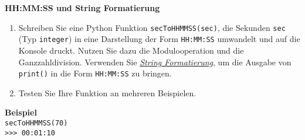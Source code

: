 \textbf{HH:MM:SS und String Formatierung}
\begin{enumerate}
	\item  Schreiben Sie eine Python Funktion \verb|secToHHMMSS(sec)|, die Sekunden \texttt{sec} (Typ \verb|integer|) in eine Darstellung der Form \verb|HH:MM:SS| umwandelt und auf die Konsole druckt. Nutzen Sie dazu die Modulooperation und die Ganzzahldivision. Verwenden Sie \href{https://docs.python.org/3/library/stdtypes.html#str.format}{\textit{String Formatierung}}, um die Ausgabe von \texttt{print()} in die Form \verb|HH:MM:SS| zu bringen.
	\item Testen Sie Ihre Funktion an mehreren Beispielen.
\end{enumerate}

\textbf{Beispiel}\\
\texttt{secToHHMMSS(70)}\\
\verb|>>> 00:01:10|\\